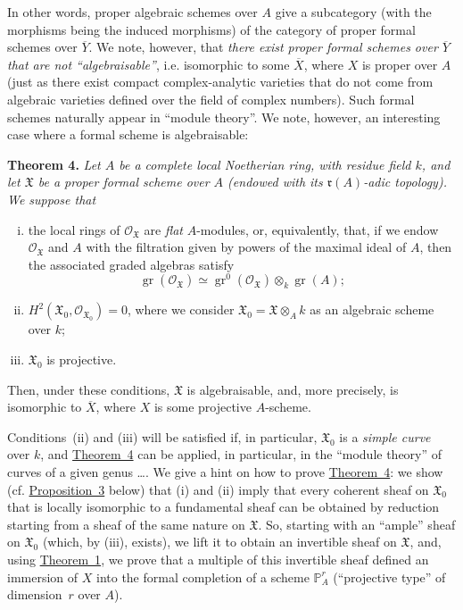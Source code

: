 \documentclass{article}
\newenvironment{itenv}[1]
  {\phantomsection\par\medskip\noindent\textbf{#1.}\itshape}
  {\par\medskip}
\newcommand{\scr}[1]{{\mathscr{#1}}}
\newcommand{\fk}{\mathfrak}
\newcommand{\PP}{\mathbb{P}}
\DeclareMathOperator{\gr}{gr}
\newcommand{\oldpage}[1]{\marginpar{\footnotesize$\Big\vert$ \textit{p.~#1}}}
\begin{document}
In other words, proper algebraic schemes over $A$ give a subcategory (with the morphisms being the induced morphisms) of the category of proper formal schemes over $\overline{Y}$.
We note, however, that \emph{there exist proper formal schemes over $\overline{Y}$ that are not ``algebraisable''}, i.e. isomorphic to some $\overline{X}$, where $X$ is proper over $A$ (just as there exist compact complex-analytic varieties that do not come from algebraic varieties defined over the field of complex numbers).
Such formal schemes naturally appear in ``module theory''.
We note, however, an interesting case where a formal scheme is algebraisable:

\begin{itenv}{Theorem 4}
\label{theorem4}
  Let $A$ be a complete local Noetherian ring, with residue field $k$, and let $\fk{X}$ be a proper formal scheme over $A$ (endowed with its $\mathfrak{r}(A)$-adic topology).
  We suppose that
  \begin{enumerate}[i.]
    \item the local rings of $\scr{O}_{\fk{X}}$ are \emph{flat} $A$-modules, or, equivalently, that, if we endow $\scr{O}_{\fk{X}}$ and $A$ with the filtration given by powers of the maximal ideal of $A$, then the associated graded algebras satisfy
      \[
        \gr(\scr{O}_{\fk{X}}) \simeq \gr^0(\scr{O}_{\fk{X}})\otimes_k\gr(A);
      \]
    \item $H^2(\fk{X}_0,\scr{O}_{\fk{X}_0})=0$, where we consider $\fk{X}_0=\fk{X}\otimes_Ak$ as an algebraic scheme over $k$;
\oldpage{182-07}
    \item $\fk{X}_0$ is projective.
  \end{enumerate}
  Then, under these conditions, $\fk{X}$ is algebraisable, and, more precisely, is isomorphic to $\overline{X}$, where $X$ is some projective $A$-scheme.
\end{itenv}

Conditions~(ii) and (iii) will be satisfied if, in particular, $\fk{X}_0$ is a \emph{simple curve} over $k$, and \hyperref[theorem4]{Theorem~4} can be applied, in particular, in the ``module theory'' of curves of a given genus \ldots.
We give a hint on how to prove \hyperref[theorem4]{Theorem~4}:
we show (cf. \hyperref[proposition3]{Proposition~3} below) that (i) and (ii) imply that every coherent sheaf on $\fk{X}_0$ that is locally isomorphic to a fundamental sheaf can be obtained by reduction starting from a sheaf of the same nature on $\fk{X}$.
So, starting with an ``ample'' sheaf on $\fk{X}_0$ (which, by (iii), exists), we lift it to obtain an invertible sheaf on $\fk{X}$, and, using \hyperref[theorem1]{Theorem~1}, we prove that a multiple of this invertible sheaf defined an immersion of $X$ into the formal completion of a scheme $\PP_A^r$ (``projective type'' of dimension~$r$ over $A$).
\end{document}
